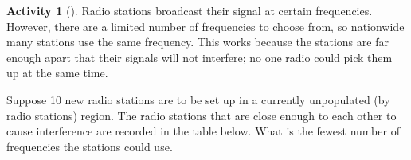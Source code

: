 \documentclass[10pt,]{book}
\theoremstyle{plain}
\theoremstyle{definition}
\theoremstyle{definition}
\theoremstyle{definition}
\newtheorem{activity}[project]{Activity}
\numberwithin{equation}{chapter}
\newlength{\panelmax}
\begin{document}
\begin{activity}[]\label{activity-34}
\hypertarget{p-364}{}%
Radio stations broadcast their signal at certain frequencies. However, there are a limited number of frequencies to choose from, so nationwide many stations use the same frequency. This works because the stations are far enough apart that their signals will not interfere; no one radio could pick them up at the same time.%
\par
\hypertarget{p-365}{}%
Suppose 10 new radio stations are to be set up in a currently unpopulated (by radio stations) region. The radio stations that are close enough to each other to cause interference are recorded in the table below. What is the fewest number of frequencies the stations could use.%
{%
\setlength{\panelmax}{0pt}
\ifdefined\panelboxAimage\else\newsavebox{\panelboxAimage}\fi%
\begin{lrbox}{\panelboxAimage}
\end{lrbox}}
\end{activity}
\end{document}
